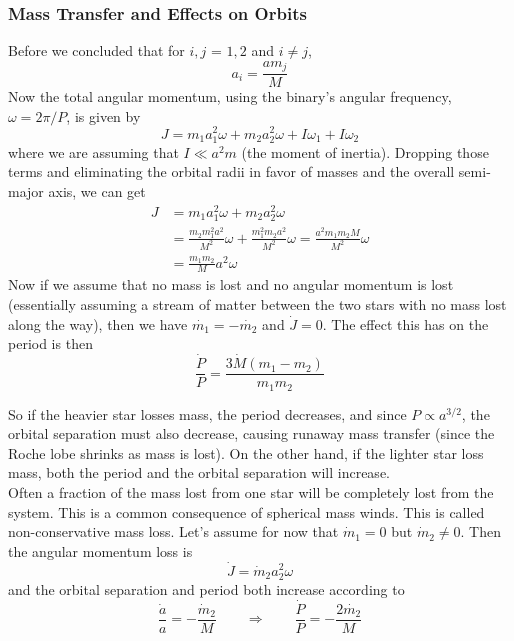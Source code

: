 \documentclass[10pt]{article}
\numberwithin{equation}{section}
\newcommand{\n}{\noindent}
\begin{document}
	\subsubsection{Mass Transfer and Effects on Orbits} %
	\label{ssub:mass_transfer_and_effects_on_orbits}
		Before we concluded that for $i,j$ = $1,2$ and $i\neq j$, 
		\begin{equation}
			\label{eq:binaries:14} a_i = \frac{a m_j}{M}
		\end{equation}
		Now the total angular momentum, using the binary's angular frequency, $\omega = 2\pi / P$, is given by
		\begin{equation}
			\label{eq:binaries:15} J = m_1a_1^2 \omega + m_2 a_2^2 \omega + I \omega_1 + I\omega_2
		\end{equation}
		where we are assuming that $I \ll a^2 m$ (the moment of inertia). Dropping those terms and eliminating the orbital radii in favor of masses and the overall semi-major axis, we can get
		\begin{align}
			\label{eq:binaries:16} J &= m_1 a_1^2\omega + m_2 a_2^2\omega\\
			\label{eq:binaries:17} &= \frac{m_2m_1^2a^2}{M^2}\omega + \frac{m_1^2m_2 a^2}{M^2}\omega = \frac{a^2m_1m_2M}{M^2}\omega\\
			\label{eq:binaries:18} &= \frac{m_1m_2}{M}a^2\omega
		\end{align}
		Now if we assume that no mass is lost and no angular momentum is lost (essentially assuming a stream of matter between the two stars with no mass lost along the way), then we have $\dot{m_1} = -\dot{m_2}$ and $\dot{J} = 0$. The effect this has on the period is then
		\begin{equation}
			\label{eq:binaries:19} \frac{\dot{P}}{P} = \frac{3\dot{M}(m_1-m_2)}{m_1m_2}
		\end{equation}
		
	So if the heavier star losses mass, the period decreases, and since $P\propto a^{3/2}$, the orbital separation must also decrease, causing runaway mass transfer (since the Roche lobe shrinks as mass is lost). On the other hand, if the lighter star loss mass, both the period and the orbital separation will increase.\\
	
	\n Often a fraction of the mass lost from one star will be completely lost from the system. This is a common consequence of spherical mass winds. This is called non-conservative mass loss. Let's assume for now that $\dot{m}_1 = 0$ but $\dot{m}_2 \neq 0$. Then the angular momentum loss is
	\begin{equation}
		\label{eq:binaries:20} \dot{J} = \dot{m}_2 a_2^2 \omega
	\end{equation}
	and the orbital separation and period both increase according to
	\begin{equation}
		\label{eq:binaries:21} \frac{\dot{a}}{a} = -\frac{\dot{m}_2}{M} \qquad \Rightarrow \qquad \frac{\dot{P}}{P} = -\frac{2\dot{m_2}}{M}
	\end{equation}
\end{document}

